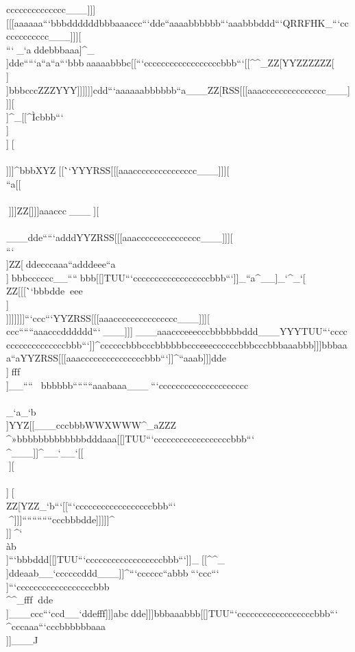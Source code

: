 cccccccccccccc___]]][[[aaaaaa```bbbddddddbbbaaaccc```dde``aaaabbbbbb```aaabbbddd```QRRFHK\]_```cccccccccccc___]]][\\```^^^_`a^^^ddebbbaaa]^_\\]dde`````a``a``a```bbb^^_aaaaabbbc[[\TUU```ccccccccccccccccccbbb```[[\^^_ZZ[YYZZZZZZ[\\]\\]bbbcccZZZYYY]]]]]]cdd```aaaaaabbbbbb``a___ZZ[RSS[[[aaaccccccccccccccc___]]][\\]^_[[\^^^cccbbb```\\]\\]^^_[\\[\\\\]\\]]]^bbbXYZ^^^[[\```YYYRSS[[[aaaccccccccccccccc___]]][\\``a[[\\\\^^^]]]ZZ[]]]aaaccc^^^___^^_\]][\\\\\___dde`````adddYYZRSS[[[aaaccccccccccccccc___]]][\\```\\]ZZ[^^^ddecccaaa``adddeee``a\\]^^^bbbcccccc__````^^^bbb[[]TUU```ccccccccccccccccccbbb```]]_``a^__]_`^_`[\\ZZ[[[\```bbbdde^^_^^_eee\\]\\]]]]]]]```ccc```YYZRSS[[[aaaccccccccccccccc___]]][\\ccc``````aaacccdddddd```^^^___]]]^^^___aaaccceeecccbbbbbbddd___YYYTUU```ccccccccccccccccccbbb```]]^ccccccbbbcccbbbbbbccceeeccccccbbbcccbbbaaabbb]]]bbbaaa``aYYZRSS[[[aaacccccccccccccccbbb```]]^``aaab]]]dde\\]^^_fff\\]__````^^^^^_^^^bbbbbb````````aaabaaa___^^^```ccccccccccccccccccccc\\\\\]_`a_`b\\]YYZ[[\___cccbbbWWXWWW^_aZZZ\\\^^^bbbbbbbbbbbbbbbdddaaa[[]TUU```ccccccccccccccccccbbb```\\^___]]^__`__`[[\\\]^^_\]][\\[\]ZZ[\\]\\]^^^[\\ZZ[YZZ_`b```[[\TUU```ccccccccccccccccccbbb```\\^^^^]]]````````````cccbbbdde]]]]]^\\]]^^]^`\\\`ab\\]```bbbddd[[]TUU```ccccccccccccccccccbbb```]]_^^_[[\^^_\\]ddeaab__`ccccccddd___]]^```cccccc``abbb^^_```ccc```\\]```ccccccccccccccccccbbb\\\^^_fff^^_^^^dde\\]___ccc```ccd__`ddefff]]]abc^^_dde]]]bbbaaabbb[[]TUU```ccccccccccccccccccbbb```\\^cccaaa```cccbbbbbbaaa\\\]]]___^^
